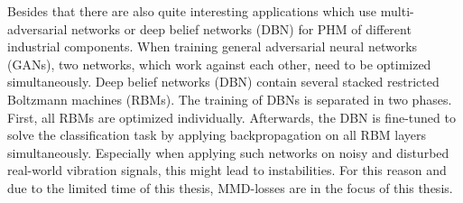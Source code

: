 Besides that there are also quite interesting applications which use multi-adversarial networks \cite{Zhang2019} or deep belief networks (DBN) \cite{ZHAO2019213} for PHM of different industrial components. When training general adversarial neural networks (GANs), two networks, which work against each other, need to be optimized simultaneously. Deep belief networks (DBN) contain several stacked restricted Boltzmann machines (RBMs). The training of DBNs is separated in two phases. First, all RBMs are optimized individually. Afterwards, the DBN is fine-tuned to solve the classification task by applying backpropagation on all RBM layers simultaneously. Especially when applying such networks on noisy and disturbed real-world vibration signals, this might lead to instabilities. For this reason and due to the limited time of this thesis, MMD-losses are in the focus of this thesis.

